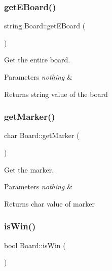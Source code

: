 \subsubsection{\texorpdfstring{get\+E\+Board()}{getEBoard()}}
{\footnotesize\ttfamily string Board\+::get\+E\+Board (\begin{DoxyParamCaption}{ }\end{DoxyParamCaption})\hspace{0.3cm}{\ttfamily [virtual]}}



Get the entire board. 


\begin{DoxyParams}{Parameters}
{\em nothing} & \\
\hline
\end{DoxyParams}
\begin{DoxyReturn}{Returns}
string value of the board 
\end{DoxyReturn}
\mbox{\label{classBoard_a735a4eec8098cf419441ebb7e4b4fa16}} 
\subsubsection{\texorpdfstring{get\+Marker()}{getMarker()}}
{\footnotesize\ttfamily char Board\+::get\+Marker (\begin{DoxyParamCaption}{ }\end{DoxyParamCaption})}



Get the marker. 


\begin{DoxyParams}{Parameters}
{\em nothing} & \\
\hline
\end{DoxyParams}
\begin{DoxyReturn}{Returns}
char value of marker 
\end{DoxyReturn}
\mbox{\label{classBoard_ae59ed3d0322d92f9d9ae3ee6652e7268}} 
\subsubsection{\texorpdfstring{is\+Win()}{isWin()}}
{\footnotesize\ttfamily bool Board\+::is\+Win (\begin{DoxyParamCaption}{ }\end{DoxyParamCaption})\hspace{0.3cm}{\ttfamily [virtual]}}



